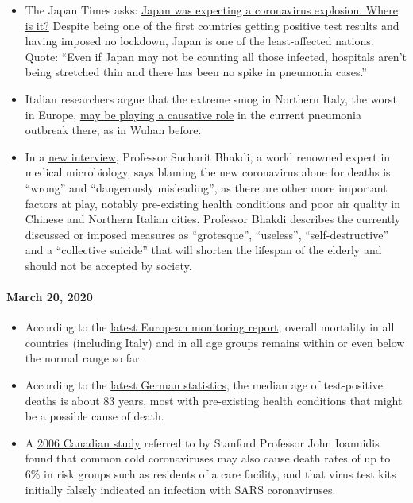 \begin{itemize}
\tightlist
\item
  The Japan Times asks:
  \href{https://www.japantimes.co.jp/news/2020/03/20/national/coronavirus-explosion-expected-japan/}{Japan
  was expecting a coronavirus explosion. Where is it?} Despite being one
  of the first countries getting positive test results and having
  imposed no lockdown, Japan is one of the least-affected nations.
  Quote: ``Even if Japan may not be counting all those infected,
  hospitals aren't being stretched thin and there has been no spike in
  pneumonia cases.''
\item
  Italian researchers argue that the extreme smog in Northern Italy, the
  worst in Europe,
  \href{https://www.heise.de/tp/features/Feinstaubpartikel-als-Viren-Vehikel-4687454.html}{may
  be playing a causative role} in the current pneumonia outbreak there,
  as in Wuhan before.
\item
  In a \href{https://www.youtube.com/watch?v=JBB9bA-gXL4}{new
  interview}, Professor Sucharit Bhakdi, a world renowned expert in
  medical microbiology, says blaming the new coronavirus alone for
  deaths is ``wrong'' and ``dangerously misleading'', as there are other
  more important factors at play, notably pre-existing health conditions
  and poor air quality in Chinese and Northern Italian cities. Professor
  Bhakdi describes the currently discussed or imposed measures as
  ``grotesque'', ``useless'', ``self-destructive'' and a ``collective
  suicide'' that will shorten the lifespan of the elderly and should not
  be accepted by society.
\end{itemize}

\hypertarget{march-20-2020}{%
\paragraph{March 20, 2020}\label{march-20-2020}}

\begin{itemize}
\tightlist
\item
  According to the \href{https://www.euromomo.eu/index.html}{latest
  European monitoring report}, overall mortality in all countries
  (including Italy) and in all age groups remains within or even below
  the normal range so far.
\item
  According to the
  \href{https://de.wikipedia.org/wiki/COVID-19-Pandemie_in_Deutschland\#Todesf\%C3\%A4lle_in_den_Medien}{latest
  German statistics}, the median age of test-positive deaths is about 83
  years, most with pre-existing health conditions that might be a
  possible cause of death.
\item
  A \href{https://www.ncbi.nlm.nih.gov/pmc/articles/PMC2095096/}{2006
  Canadian study} referred to by Stanford Professor John Ioannidis found
  that common cold coronaviruses may also cause death rates of up to 6\%
  in risk groups such as residents of a care facility, and that virus
  test kits initially falsely indicated an infection with SARS
  coronaviruses.
\end{itemize}

